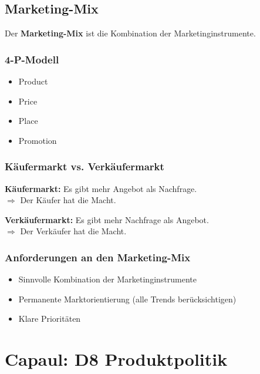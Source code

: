 \documentclass[12pt]{article}
\begin{document}
\subsection{Marketing-Mix}
\begin{Definitionsbox}
    Der \textbf{Marketing-Mix} ist die Kombination der Marketinginstrumente.
\end{Definitionsbox}

\subsubsection{4-P-Modell}
\begin{itemize}
    \item Product
    \item Price
    \item Place
    \item Promotion
\end{itemize}

\subsubsection{Käufermarkt vs. Verkäufermarkt}
\begin{Definitionsbox}
    \textbf{Käufermarkt:} Es gibt mehr Angebot als Nachfrage.\\
    $\Rightarrow$ Der Käufer hat die Macht.
\end{Definitionsbox}
\begin{Definitionsbox}
    \textbf{Verkäufermarkt:} Es gibt mehr Nachfrage als Angebot.\\
    $\Rightarrow$ Der Verkäufer hat die Macht.
\end{Definitionsbox}

\subsubsection{Anforderungen an den Marketing-Mix}
\begin{itemize}
    \item Sinnvolle Kombination der Marketinginstrumente
    \item Permanente Marktorientierung (alle Trends berücksichtigen)
    \item Klare Prioritäten
\end{itemize}


\section{Capaul: D8 Produktpolitik}
\end{document}
